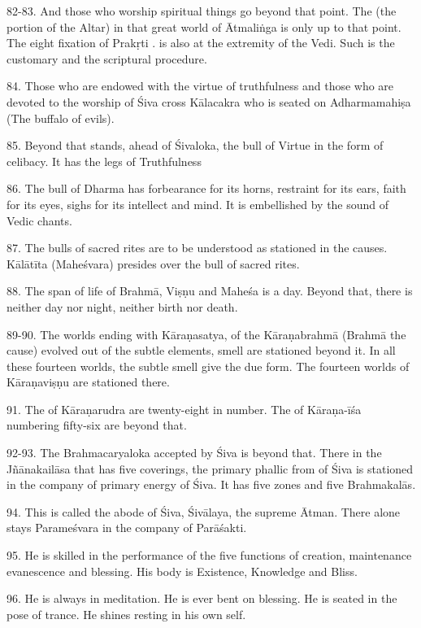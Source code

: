 82-83. And those who worship spiritual things go beyond that point.
The  (the portion of the Altar) in that great world of Ātmaliṅga
is only up to that point. The eight fixation of Prakṛti \etc. is also at
the extremity of the Vedi. Such is the customary and the scriptural procedure.

84. Those who are endowed with the virtue of truthfulness \etc and those who are
devoted to the worship of Śiva cross Kālacakra who is seated on Adharmamahiṣa
(The buffalo of evils).

85. Beyond that stands, ahead of Śivaloka, the bull of Virtue in the form of
celibacy. It has the legs of Truthfulness \etc

86. The bull of Dharma has forbearance for its horns, restraint for its ears,
faith for its eyes, sighs for its intellect and mind. It is embellished by
the sound of Vedic chants.

87. The bulls of sacred rites \etc are to be understood as stationed in
the causes. Kālātīta (\ie Maheśvara) presides over the bull of sacred rites.

88. The span of life of Brahmā, Viṣṇu and Maheśa is a day. Beyond that, there is
neither day nor night, neither birth nor death.

89-90. The worlds ending with Kāraṇasatya, of the Kāraṇabrahmā (Brahmā the cause)
evolved out of the subtle elements, smell \etc are stationed beyond it. In all
these fourteen worlds, the subtle smell \etc give the due form. The fourteen
worlds of Kāraṇaviṣṇu are stationed there.

91. The  of Kāraṇarudra are twenty-eight in number. The  of
Kāraṇa-īśa numbering fifty-six are beyond that.

92-93. The Brahmacaryaloka accepted by Śiva is beyond that. There in
the Jñānakailāsa that has five coverings, the primary phallic from of Śiva is
stationed in the company of primary energy of Śiva. It has five zones and five
Brahmakalās.

94. This is called the abode of Śiva, Śivālaya, the supreme Ātman. There alone
stays Parameśvara in the company of Parāśakti.

95. He is skilled in the performance of the five functions of creation,
maintenance evanescence and blessing. His body is Existence, Knowledge and Bliss.

96. He is always in meditation. He is ever bent on blessing. He is seated in
the pose of trance. He shines resting in his own self.

